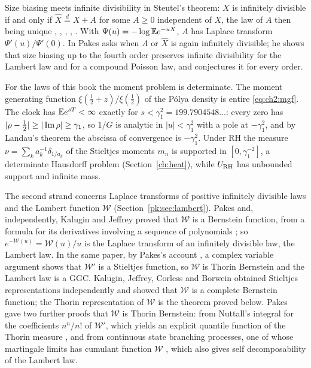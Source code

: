 Size biasing meets infinite divisibility in Steutel's theorem: $X$ is infinitely divisible if and only if $\widehat X\stackrel d=X+A$ for some $A\ge0$ independent of $X$, the law of $A$ then being unique \cite{Steutel73}, \cite[Theorem 51.1]{Sato99}, \cite{SvH}, \cite[Theorem 11.1]{AGK19}, \cite{PSF96}. With $\Psi(u)=-\log\mathbb{E} e^{-uX}$, $A$ has Laplace transform $\Psi'(u)/\Psi'(0)$. In \cite{Pakes14} Pakes asks when $A$ or $\widehat X$ is again infinitely divisible; he shows that size biasing up to the fourth order preserves infinite divisibility for the Lambert law and for a compound Poisson law, and conjectures it for every order.

For the laws of this book the moment problem is determinate. The moment generating function $\xi(\frac12+z)/\xi(\frac12)$ of the P\'olya density is entire \eqref{eq:ch2:mgf}. The clock has $\mathbb{E} e^{sT}<\infty$ exactly for $s<\gamma_1^2=199.7904548\ldots$: every zero has $|\rho-\frac12|\ge|\operatorname{Im}\rho|\ge\gamma_1$, so $1/G$ is analytic in $|u|<\gamma_1^2$ with a pole at $-\gamma_1^2$, and by Landau's theorem \cite[Chapter~II, Theorem~5b]{Widder41} the abscissa of convergence is $-\gamma_1^2$. Under RH the measure $\nu=\sum_ka_k^{-1}\delta_{1/a_k}$ of the Stieltjes moments $m_n$ is supported in $[0,\gamma_1^{-2}]$, a determinate Hausdorff problem (Section~\ref{ch:heat}), while $U_{\mathrm{RH}}$ has unbounded support and infinite mass.

The second strand concerns Laplace transforms of positive infinitely divisible laws and the Lambert function $\mathcal W$ (Section~\ref{pk:sec:lambert}). Pakes \cite{Pakes11} and, independently, Kalugin and Jeffrey \cite{KJ10} proved that $\mathcal W$ is a Bernstein function, from a formula for its derivatives involving a sequence of polynomials \cite[(8)]{Pakes26}; so $e^{-\mathcal W(u)}=\mathcal W(u)/u$ is the Laplace transform of an infinitely divisible law, the Lambert law. In the same paper, by Pakes's account \cite[Section 2]{Pakes26}, a complex variable argument shows that $\mathcal W'$ is a Stieltjes function, so $\mathcal W$ is Thorin Bernstein and the Lambert law is a GGC. Kalugin, Jeffrey, Corless and Borwein \cite{KJCB12} obtained Stieltjes representations independently and showed that $\mathcal W$ is a complete Bernstein function; the Thorin representation of $\mathcal W$ is the theorem proved below. Pakes gave two further proofs that $\mathcal W$ is Thorin Bernstein: from Nuttall's integral for the coefficients $n^n/n!$ of $\mathcal W'$, which yields an explicit quantile function of the Thorin measure \cite{Pakes18}, and from continuous state branching processes, one of whose martingale limits has cumulant function $\mathcal W$ \cite{Pakes20}, which also gives self decomposability of the Lambert law.

